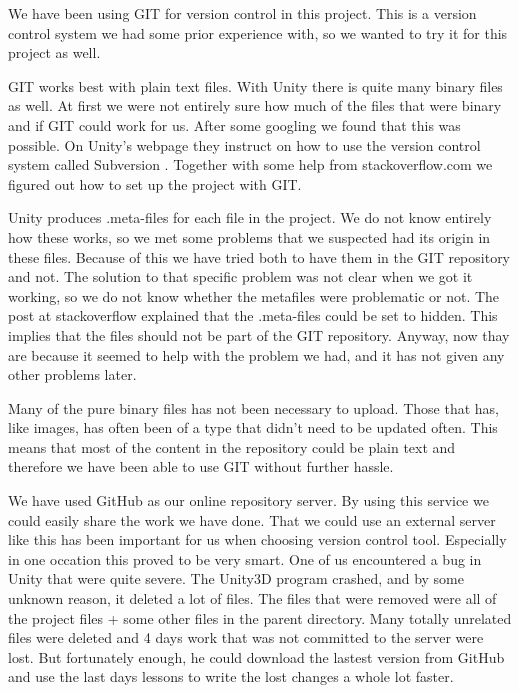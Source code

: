 We have been using GIT for version control in this project. This is a version
control system we had some prior experience with, so we wanted to try it for 
this project as well. 

GIT works best with plain text files. With Unity there is quite many binary
files as well. At first we were not entirely sure how much of the files that
were binary and if GIT could work for us. After some googling we found that 
this was possible. On Unity's webpage they instruct on how to use the version
control system called Subversion \cite{SubversionControl}. Together with some
help from stackoverflow.com\cite{gitVersionControl} we figured out how to set 
up the project with GIT.

Unity produces .meta-files for each file in the project. We do not know 
entirely how these works, so we met some problems that we suspected had its
origin in these files. Because of this we have tried both to have them in
the GIT repository and not. The solution to that specific problem was not
clear when we got it working, so we do not know whether the metafiles were
problematic or not. The post at stackoverflow explained that the .meta-files 
could be set to hidden. This implies that the files should not be part
of the GIT repository. Anyway, now thay are because it seemed to help with the
problem we had, and it has not given any other problems later.

Many of the pure binary files has not been necessary to upload. Those that
has, like images, has often been of a type that didn't need to be updated
often. This means that most of the content in the repository could be plain
text and therefore we have been able to use GIT without further hassle.

We have used GitHub \cite{GitHub} as our online repository server. By using
this service we could easily share the work we have done. That we could use
an external server like this has been important for us when choosing version
control tool. Especially in one occation this proved to be very smart. One of
us encountered a bug in Unity that were quite severe. The Unity3D program
crashed, and by some unknown reason, it deleted a lot of files. The files that
were removed were all of the project files + some other files in the parent
directory. Many totally unrelated files were deleted and 4 days work that was
not committed to the server were lost. But fortunately enough, he could
download the lastest version from GitHub and use the last days lessons to write
the lost changes a whole lot faster.

